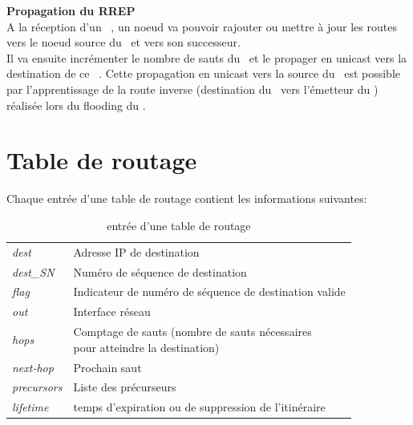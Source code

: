        \vspace{0.5cm}
        \textbf{Propagation du RREP}\\
            A la réception d'un \rrep\ , un noeud va pouvoir rajouter ou mettre à jour
            les routes vers le noeud source du \rrep\  et vers son successeur.\\
            Il va ensuite incrémenter le nombre de sauts du \rrep\  et le propager en unicast vers la destination de ce \rrep\ .
            Cette propagation en unicast vers la source du \rreq\ est possible par l'apprentissage de la route inverse
            (destination du \rreq\ vers l'émetteur du \rreq) réalisée lors du flooding du \rreq.

    \section{Table de routage}
        Chaque entrée d'une table de routage contient les informations suivantes:
        
        \begin{table}[H]
            \centering
            \begin{tabular}{|l|l|}
                \hline
                \textit{dest}       & Adresse IP de destination\\
                \textit{dest\_SN}   & Numéro de séquence de destination\\
                \textit{flag}       & Indicateur de numéro de séquence de destination valide\\
                \textit{out}        & Interface réseau\\
                \textit{hops}       & \makecell[l]{Comptage de sauts (nombre de sauts nécessaires\\ pour atteindre la destination)}\\
                \textit{next-hop}   & Prochain saut\\
                \textit{precursors} & Liste des précurseurs\\
                \textit{lifetime}   & temps d'expiration ou de suppression de l'itinéraire\\
                \hline
            \end{tabular}
            \caption{entrée d'une table de routage \aodv \cite{aodv_w}}
            \label{routingTable_aodv}
        \end{table}


